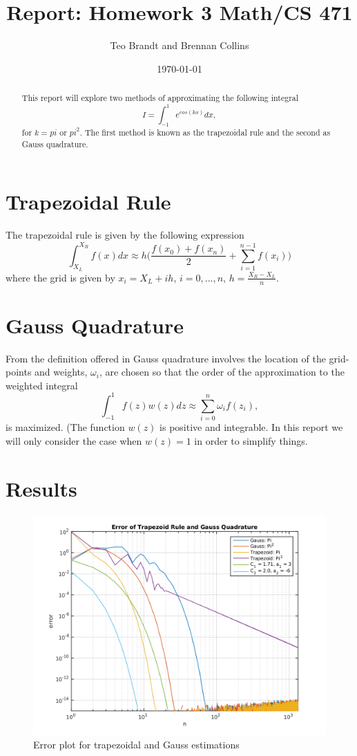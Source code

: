 \documentclass[12pt]{article}
\title{Report: Homework 3 Math/CS 471}
\author{Teo Brandt and Brennan Collins}
\date{\today}   %
\theoremstyle{definition}
\theoremstyle{definition}
\begin{document}
\maketitle

\begin{abstract}
This report will explore two methods of approximating the following integral
\[
I=\int_{-1}^{1}e^{cos(kx)}dx,
\]
for \(k=pi\text{ or }pi^{2}\). The first method is known as the trapezoidal rule and the second as Gauss quadrature.
\end{abstract}

\section{Trapezoidal Rule}
The trapezoidal rule is given by the following expression
\[
\int_{X_{L}}^{X_R}f(x)dx\approx h\bigg(\frac{f(x_{0})+f(x_{n})}{2}+\sum_{i=1}^{n-1}f(x_{i})\bigg)
\]
where the grid is given by \(x_{i}=X_{L}+ih\text{, }i=0,...,n\text{, }h=\frac{X_{R}-X_{L}}{n}\).
\section{Gauss Quadrature}
From the definition offered in \cite{HW} Gauss quadrature involves the location of the grid-points and weights, \(\omega_{i}\), are chosen so that the order of the approximation to the weighted integral
\[
\int_{-1}^{1}f(z)w(z)dz\approx \sum_{i=0}^{n}\omega_{i}f(z_{i}),
\]
is maximized. (The function \(w(z)\) is positive and integrable. In this report we will only consider the case when \(w(z)=1\) in order to simplify things.

\section{Results}
\begin{figure}[h]
\caption{Error plot for trapezoidal and Gauss estimations}
\centering
\includegraphics[width=1\textwidth]{ErrorPlot}
\end{figure}
\end{document}
